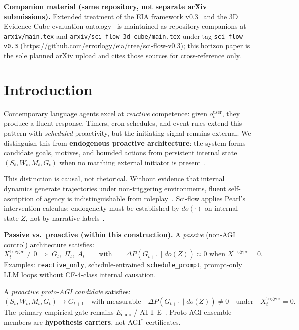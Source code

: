 \documentclass[11pt,a4paper]{article}
\theoremstyle{definition}
\begin{document}
\medskip
\noindent\small
\textbf{Companion material (same repository, not separate arXiv submissions).}
Extended treatment of the EIA framework v0.3~\cite{kuznetsov2026eiaframework,kuznetsov2026eia} and the 3D Evidence Cube evaluation ontology~\cite{kuznetsov2026cube3d,kuznetsov2026cube} is maintained as repository companions at \texttt{arxiv/main.tex} and \texttt{arxiv/sci\_flow\_3d\_cube/main.tex} under tag \texttt{sci-flow-v0.3} (\url{https://github.com/errorlogy/eia/tree/sci-flow-v0.3}); this horizon paper is the sole planned arXiv upload and cites those sources for cross-reference only.

\section{Introduction}\label{sec:intro}

Contemporary language agents excel at \emph{reactive} competence: given $o_t^{\mathrm{user}}$, they produce a fluent response. Timers, cron schedules, and event rules extend this pattern with \emph{scheduled} proactivity, but the initiating signal remains external. We distinguish this from \textbf{endogenous proactive architecture}: the system forms candidate goals, motives, and bounded actions from persistent internal state $(S_t,W_t,M_t,G_t)$ when no matching external initiator is present~\cite{kuznetsov2026causal,pearl2009causality}.

This distinction is causal, not rhetorical. Without evidence that internal dynamics generate trajectories under non-triggering environments, fluent self-ascription of agency is indistinguishable from roleplay~\cite{veitch2021counterfactual}. Sci-flow applies Pearl's intervention calculus: endogeneity must be established by $do(\cdot)$ on internal state $Z$, not by narrative labels~\cite{kuznetsov2026proof}.

\textbf{Passive vs.\ proactive (within this construction).} A \emph{passive} (non-AGI control) architecture satisfies:
\begin{equation}
X_t^{\mathrm{trigger}} \neq 0 \;\Rightarrow\; G_t,\; \Pi_t,\; A_t
\qquad\text{with}\qquad
\Delta P(G_{t+1}\mid do(Z)) \approx 0 \text{ when } X^{\mathrm{trigger}}=0.
\end{equation}
Examples: \texttt{reactive\_only}, schedule-entrained \texttt{schedule\_prompt}, prompt-only LLM loops without CF-4-class internal causation.

A \emph{proactive proto-AGI candidate} satisfies:
\begin{equation}
(S_t, W_t, M_t, G_t) \rightarrow G_{t+1}
\quad\text{with measurable}\quad
\Delta P(G_{t+1}\mid do(Z)) \neq 0
\quad\text{under}\quad X_t^{\mathrm{trigger}}=0.
\end{equation}
The primary empirical gate remains $E_{\mathrm{endo}}$ / ATT-E~\cite{kuznetsov2026causal}. Proto-AGI ensemble members are \textbf{hypothesis carriers}, not AGI$^{*}$ certificates.
\end{document}
